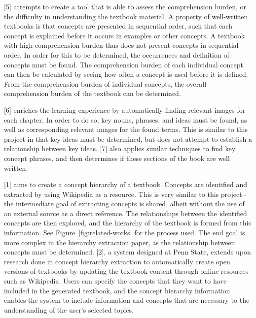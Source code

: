 \documentclass{article} %
\begin{document}
[5] attempts to create a tool that is able to assess the comprehension burden, or the difficulty in understanding the textbook material. A property of well-written textbooks is that concepts are presented in sequential order, such that each concept is explained before it occurs in examples or other concepts. A textbook with high comprehension burden thus does not present concepts in sequential order. In order for this to be determined, the occurrences and definition of concepts must be found. The comprehension burden of each individual concept can then be calculated by seeing how often a concept is used before it is defined. From the comprehension burden of individual concepts, the overall comprehension burden of the textbook can be determined.

[6] enriches the learning experience by automatically finding relevant images for each chapter. In order to do so, key nouns, phrases, and ideas must be found, as well as corresponding relevant images for the found terms. This is similar to this project in that key ideas must be determined, but does not attempt to establish a relationship between key ideas. [7] also applies similar techniques to find key concept phrases, and then determines if these sections of the book are well written.

[1] aims to create a concept hierarchy of a textbook. Concepts are identified and extracted by using Wikipedia as a resource. This is very similar to this project - the intermediate goal of extracting concepts is shared, albeit without the use of an external source as a direct reference. The relationships between the identified concepts are then explored, and the hierarchy of the textbook is formed from this information. See Figure~\ref{fig:related-works} for the process used. The end goal is more complex in the hierarchy extraction paper, as the relationship between concepts must be determined. [2], a system designed at Penn State, extends upon research done in concept hierarchy extraction to automatically create open versions of textbooks by updating the textbook content through online resources such as Wikipedia. Users can specify the concepts that they want to have included in the generated textbook, and the concept hierarchy information enables the system to include information and concepts that are necessary to the understanding of the user’s selected topics.
\end{document}

